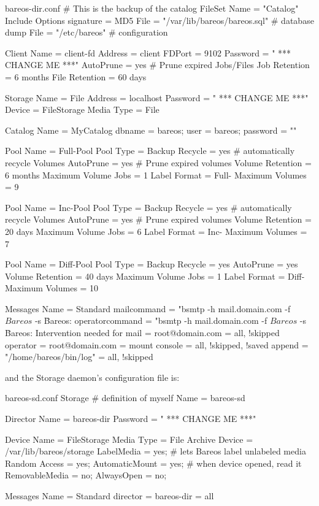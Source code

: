 \begin{bconfig}{bareos-dir.conf}
# This is the backup of the catalog
FileSet {
  Name = "Catalog"
  Include {
    Options {
      signature = MD5
    }
    File = "/var/lib/bareos/bareos.sql" # database dump
    File = "/etc/bareos"                # configuration
  }
}

Client {
  Name = client-fd
  Address = client
  FDPort = 9102
  Password = " *** CHANGE ME ***"
  AutoPrune = yes      # Prune expired Jobs/Files
  Job Retention = 6 months
  File Retention = 60 days
}

Storage {
  Name = File
  Address = localhost
  Password = " *** CHANGE ME ***"
  Device = FileStorage
  Media Type = File
}

Catalog {
  Name = MyCatalog
  dbname = bareos; user = bareos; password = ""
}

Pool {
  Name = Full-Pool
  Pool Type = Backup
  Recycle = yes           # automatically recycle Volumes
  AutoPrune = yes         # Prune expired volumes
  Volume Retention = 6 months
  Maximum Volume Jobs = 1
  Label Format = Full-
  Maximum Volumes = 9
}

Pool {
  Name = Inc-Pool
  Pool Type = Backup
  Recycle = yes           # automatically recycle Volumes
  AutoPrune = yes         # Prune expired volumes
  Volume Retention = 20 days
  Maximum Volume Jobs = 6
  Label Format = Inc-
  Maximum Volumes = 7
}

Pool {
  Name = Diff-Pool
  Pool Type = Backup
  Recycle = yes
  AutoPrune = yes
  Volume Retention = 40 days
  Maximum Volume Jobs = 1
  Label Format = Diff-
  Maximum Volumes = 10
}

Messages {
  Name = Standard
  mailcommand = "bsmtp -h mail.domain.com -f \"\(Bareos\) %
      -s \"Bareos: %
  operatorcommand = "bsmtp -h mail.domain.com -f \"\(Bareos\) %
      -s \"Bareos: Intervention needed for %
  mail = root@domain.com = all, !skipped
  operator = root@domain.com = mount
  console = all, !skipped, !saved
  append = "/home/bareos/bin/log" = all, !skipped
}
\end{bconfig}

and the Storage daemon's configuration file is:

\begin{bconfig}{bareos-sd.conf}
Storage {               # definition of myself
  Name = bareos-sd
}

Director {
  Name = bareos-dir
  Password = " *** CHANGE ME ***"
}

Device {
  Name = FileStorage
  Media Type = File
  Archive Device = /var/lib/bareos/storage
  LabelMedia = yes;    # lets Bareos label unlabeled media
  Random Access = yes;
  AutomaticMount = yes;   # when device opened, read it
  RemovableMedia = no;
  AlwaysOpen = no;
}

Messages {
  Name = Standard
  director = bareos-dir = all
}
\end{bconfig}

